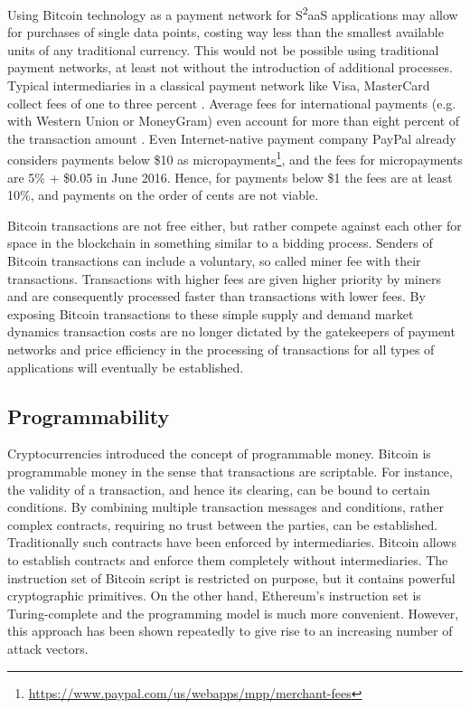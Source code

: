 Using Bitcoin technology as a payment network for S\textsuperscript{2}aaS applications may allow for purchases of single data points, costing way less than the smallest available units of any traditional currency. This would not be possible using traditional payment networks, at least not without the introduction of additional processes. Typical intermediaries in a classical payment network like Visa, MasterCard collect fees of one to three percent \parencite{chakravorti2003theory}. Average fees for international payments (e.g. with Western Union or MoneyGram) even account for more than eight percent of the transaction amount \parencite{remittances}. Even Internet-native payment company PayPal already considers payments below \$10 as micropayments\footnote{\url{https://www.paypal.com/us/webapps/mpp/merchant-fees}}, and the fees for micropayments are 5\% + \$0.05 in June 2016. Hence, for payments below \$1 the fees are at least 10\%, and payments on the order of cents are not viable.

Bitcoin transactions are not free either, but rather compete against each other for space in the blockchain in something similar to a bidding process. Senders of Bitcoin transactions can include a voluntary, so called miner fee with their transactions. Transactions with higher fees are given higher priority by miners and are consequently processed faster than transactions with lower fees. By exposing Bitcoin transactions to these simple supply and demand market dynamics transaction costs are no longer dictated by the gatekeepers of payment networks and price efficiency in the processing of transactions for all types of applications will eventually be established.

\subsection{Programmability}
\label{subsec:script}

Cryptocurrencies introduced the concept of programmable money.
Bitcoin is programmable money in the sense that transactions are scriptable. For instance, the validity of a transaction, and hence its clearing, can be bound to certain conditions. By combining multiple transaction messages and conditions, rather complex contracts, requiring no trust between the parties, can be established. Traditionally such contracts have been enforced by intermediaries. Bitcoin allows to establish contracts and enforce them completely without intermediaries. The instruction set of Bitcoin script is restricted on purpose, but it contains powerful cryptographic primitives. On the other hand, Ethereum's instruction set is Turing-complete and the programming model is much more convenient. However, this approach has been shown repeatedly to give rise to an increasing number of attack vectors. 

